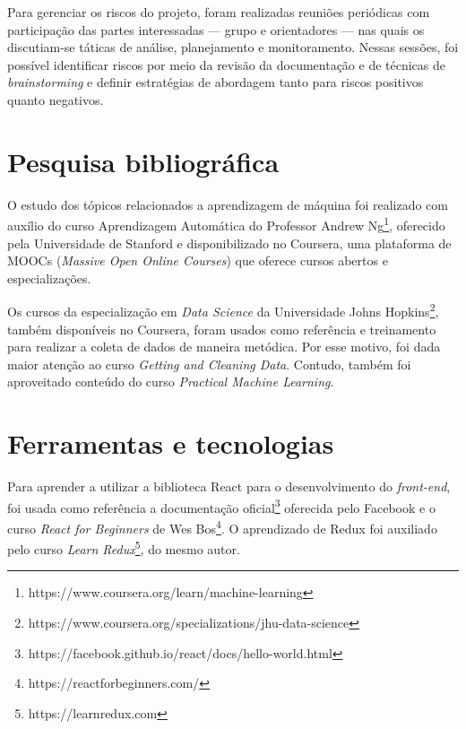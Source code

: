Para gerenciar os riscos do projeto, foram realizadas reuniões periódicas com participação das partes interessadas --- grupo e orientadores --- nas quais os discutiam-se táticas de análise, planejamento e monitoramento. Nessas sessões, foi possível identificar riscos por meio da revisão da documentação e de técnicas de \emph{brainstorming} e definir estratégias de abordagem tanto para riscos positivos quanto negativos.

\section{Pesquisa bibliográfica}

O estudo dos tópicos relacionados a aprendizagem de máquina foi realizado com auxílio do curso Aprendizagem Automática do Professor Andrew Ng\footnote{ https://www.coursera.org/learn/machine-learning}, oferecido pela Universidade de Stanford e disponibilizado no Coursera, uma plataforma de MOOCs (\textit{Massive Open Online Courses}) que oferece cursos abertos e especializações.

Os cursos da especialização em \textit{Data Science} da Universidade Johns Hopkins\footnote{ https://www.coursera.org/specializations/jhu-data-science}, também disponíveis no Coursera, foram usados como referência e treinamento para realizar a coleta de dados de maneira metódica. Por esse motivo, foi dada maior atenção ao curso \textit{Getting and Cleaning Data}. Contudo, também foi aproveitado conteúdo do curso \textit{Practical Machine Learning}.

\section{Ferramentas e tecnologias}

Para aprender a utilizar a biblioteca React para o desenvolvimento do \emph{front-end}, foi usada como referência a documentação oficial\footnote{https://facebook.github.io/react/docs/hello-world.html} oferecida pelo Facebook e o curso \textit{React for Beginners} de Wes Bos\footnote{ https://reactforbeginners.com/}. O aprendizado de Redux foi auxiliado pelo curso \textit{Learn Redux}\footnote{https://learnredux.com}, do mesmo autor.
